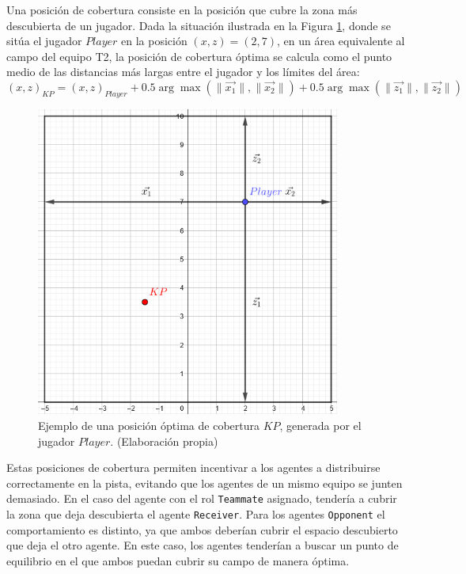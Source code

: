 Una posición de cobertura consiste en la posición que cubre la zona más descubierta de un jugador. Dada la situación ilustrada en la Figura \ref{fig:coverage-example}, donde se sitúa el jugador $Player$ en la posición $(x, z) = (2, 7)$, en un área equivalente al campo del equipo T2, la posición de cobertura óptima se calcula como el punto medio de las distancias más largas entre el jugador y los límites del área:
\begin{equation}
    (x, z)_{KP} = (x, z)_{Player} + {0\text{.}5} \arg\max(\|\overrightarrow{x_1}\|, \|\overrightarrow{x_2}\|) + {0\text{.}5} \arg\max(\|\overrightarrow{z_1}\|, \|\overrightarrow{z_2}\|)
\end{equation}

\begin{figure}[H]
    \centering
    \includegraphics[width=10cm]{figures/coverage-example.png}
    \caption[Ejemplo de una posición óptima de cobertura]{Ejemplo de una posición óptima de cobertura $KP$, generada por el jugador $Player$. (Elaboración propia)}
    \label{fig:coverage-example}
\end{figure}

Estas posiciones de cobertura permiten incentivar a los agentes a distribuirse correctamente en la pista, evitando que los agentes de un mismo equipo se junten demasiado. En el caso del agente con el rol \texttt{Teammate} asignado, tendería a cubrir la zona que deja descubierta el agente \texttt{Receiver}. Para los agentes \texttt{Opponent} el comportamiento es distinto, ya que ambos  deberían cubrir el espacio descubierto que deja el otro agente. En este caso, los agentes tenderían a buscar un punto de equilibrio en el que ambos puedan cubrir su campo de manera óptima.

